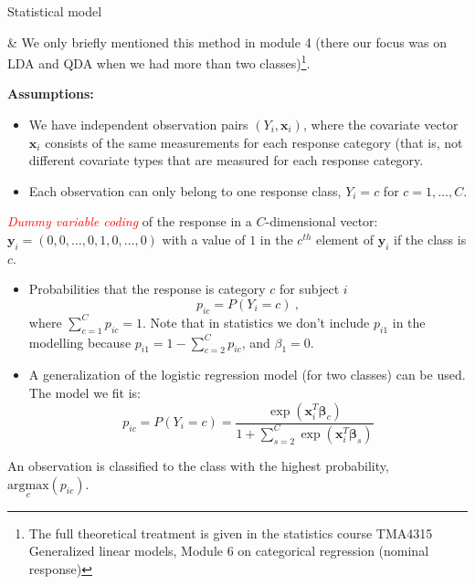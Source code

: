 \documentclass[10pt,ignorenonframetext,]{beamer}
\begin{document}
\begin{frame}

\begin{block}{Statistical model}

\vspace{2mm}

\& We only briefly mentioned this method in module 4 (there our focus
was on LDA and QDA when we had more than two
classes)\footnote{The full theoretical treatment is given in the statistics course TMA4315 Generalized linear models, Module 6 on categorical regression (nominal response)}.

\vspace{4mm}

\textbf{Assumptions:}

\begin{itemize}
\item
  We have independent observation pairs \((Y_i,{\boldsymbol x}_i)\),
  where the covariate vector \({\boldsymbol x}_i\) consists of the same
  measurements for each response category (that is, not different
  covariate types that are measured for each response category.
\item
  Each observation can only belong to one response class, \(Y_i=c\) for
  \(c=1,\ldots, C\).
\end{itemize}

\emph{\textcolor{red}{Dummy variable coding}} of the response in a
\(C\)-dimensional vector:
\({\boldsymbol y}_i=(0,0,\ldots,0,1,0,\ldots,0)\) with a value of \(1\)
in the \(c^{th}\) element of \({\boldsymbol y}_i\) if the class is
\(c\).

\end{block}

\end{frame}

\begin{frame}

\begin{itemize}
\item
  Probabilities that the response is category \(c\) for subject \(i\)
  \[p_{ic}=P(Y_i=c)  \ ,\] where \(\sum_{c=1}^C p_{ic}=1\). Note that in
  statistics we don't include \(p_{i1}\) in the modelling because
  \(p_{i1}=1-\sum_{c=2}^{C} p_{ic}\), and \(\beta_1=0\).
\item
  A generalization of the logistic regression model (for two classes)
  can be used. The model we fit is:
  \[p_{ic}=P(Y_i=c)= \frac{\exp({\boldsymbol x}_i^T{\boldsymbol \beta}_c)}{1+\sum_{s=2}^{C}\exp({\boldsymbol x}_i^T{\boldsymbol \beta}_s)}\]
\end{itemize}

An observation is classified to the class with the highest probability,
\(\underset{c}{\text{argmax}}(p_{ic})\).

\end{frame}
\end{document}
